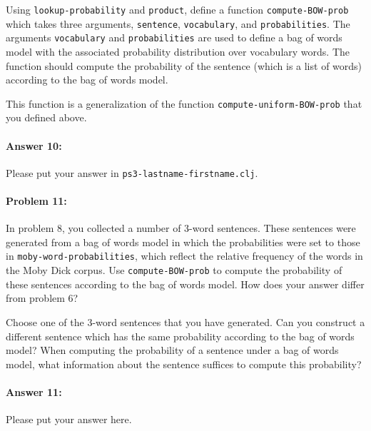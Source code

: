 \documentclass[10pt]{article}
\newcommand{\PSnum}{3}
\begin{document}
Using \texttt{lookup-probability} and \texttt{product}, define a
function \texttt{compute-BOW-prob} which takes three arguments,
\texttt{sentence}, \texttt{vocabulary}, and
\texttt{probabilities}. The arguments \texttt{vocabulary} and
\texttt{probabilities} are used to define a bag of words model with
the associated probability distribution over vocabulary words. The
function should compute the probability of the sentence (which is a
list of words) according to the bag of words model.

This function is a generalization of the function
\texttt{compute-uniform-BOW-prob} that you defined above.

\paragraph{Answer 10:} Please put your answer in
\texttt{ps\PSnum-lastname-firstname.clj}.

\noindent\hrulefill %

\paragraph{Problem 11:}

In problem 8, you collected a number of 3-word sentences. These
sentences were generated from a bag of words model in which the
probabilities were set to those in \texttt{moby-word-probabilities},
which reflect the relative frequency of the words in the Moby Dick
corpus. Use \texttt{compute-BOW-prob} to compute the probability of
these sentences according to the bag of words model. How does your
answer differ from problem 6?

Choose one of the 3-word sentences that you have generated. Can you
construct a different sentence which has the same probability
according to the bag of words model? When computing the probability of
a sentence under a bag of words model, what information about the
sentence suffices to compute this probability?

\paragraph{Answer 11:} Please put your answer here.
\end{document}
